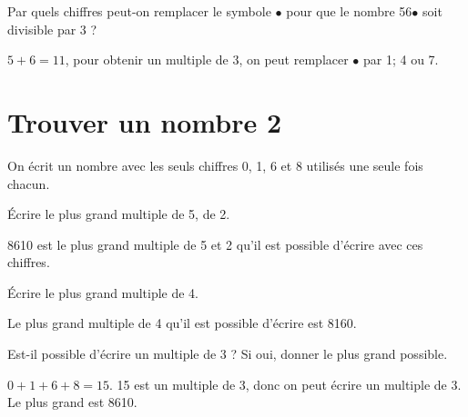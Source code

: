 \documentclass[a4paper,11pt]{exam}
\begin{document}
	\begin{questions}
		\question Par quels chiffres peut-on remplacer le symbole $\bullet$ pour que le nombre 56$\bullet$ soit divisible par 3 ?
		\begin{solution}
			$5+6 = 11$, pour obtenir un multiple de 3, on peut remplacer $\bullet$ par 1; 4 ou 7.
		\end{solution}
	\end{questions} 
	
\section{Trouver un nombre 2}

On écrit un nombre avec les seuls chiffres 0, 1, 6 et 8 utilisés une seule fois chacun.
\begin{questions}
	\question \'Ecrire le plus grand multiple de 5, de 2.
	\begin{solution}
		\num{8610} est le plus grand multiple de 5 et 2 qu'il est possible d'écrire avec ces chiffres.
	\end{solution}
	
	\question \'Ecrire le plus grand multiple de 4.
	\begin{solution}
		Le plus grand multiple de 4 qu'il est possible d'écrire est \num{8160}.
	\end{solution}
	
	\question Est-il possible d'écrire un multiple de 3 ? Si oui, donner le plus grand possible.
	\begin{solution}
		$ 0 + 1 + 6 + 8 = 15$. 15 est un multiple de 3, donc on peut écrire un multiple de 3. Le plus grand est \num{8610}.
	\end{solution}
\end{questions}
\end{document}

